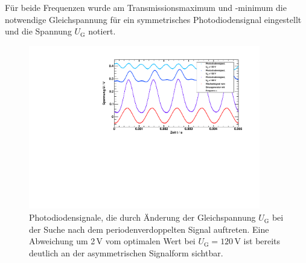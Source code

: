 Für beide Frequenzen wurde am Transmissionsmaximum und -minimum
die notwendige Gleichspannung für ein symmetrisches
Photodiodensignal eingestellt und die Spannung $U_{\text{G}}$ notiert.

\begin{figure}[H]
\begin{center}
  \includegraphics[width=0.9\textwidth]{../img/pockdurchf.pdf}
  \caption{Photodiodensignale, die durch Änderung der Gleichspannung $U_\text{G}$
  bei der Suche nach dem periodenverdoppelten Signal auftreten.
  Eine Abweichung um 2\,V vom optimalen Wert bei $U_\text{G}=120$\,V ist bereits deutlich 
  an der asymmetrischen Signalform sichtbar.}
  \label{img:pockdurchf}
\end{center}
\end{figure}